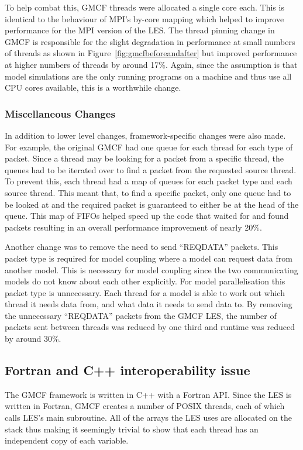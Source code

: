 To help combat this, GMCF threads were allocated a single core each. This is
identical to the behaviour of MPI's by-core mapping which helped to improve
performance for the MPI version of the LES. The thread pinning change in GMCF is
responsible for the slight degradation in performance at small numbers of
threads as shown in Figure~\ref{fig:gmcfbeforeandafter} but improved performance
at higher numbers of threads by around 17\%. Again, since the assumption is that
model simulations are the only running programs on a machine and thus use all
CPU cores available, this is a worthwhile change.

\subsubsection{Miscellaneous Changes}

In addition to lower level changes, framework-specific changes were also made.
For example, the original GMCF had one queue for each thread for each type of
packet. Since a thread may be looking for a packet from a specific thread, the
queues had to be iterated over to find a packet from the requested source
thread. To prevent this, each thread had a map of queues for each packet type
and each source thread. This meant that, to find a specific packet, only one
queue had to be looked at and the required packet is guaranteed to either be at
the head of the queue. This map of FIFOs helped speed up the code that waited
for and found packets resulting in an overall performance improvement of nearly
20\%.

Another change was to remove the need to send ``REQDATA'' packets. This packet
type is required for model coupling where a model can request data from another
model. This is necessary for model coupling since the two communicating models
do not know about each other explicitly. For model parallelisation this packet
type is unnecessary. Each thread for a model is able to work out which thread it
needs data from, and what data it needs to send data to. By removing the
unnecessary ``REQDATA'' packets from the GMCF LES, the number of packets sent
between threads was reduced by one third and runtime was reduced by around 30\%. 

\subsection{Fortran and C++ interoperability issue}
\label{sec:fortrancppinteroperability}

The GMCF framework is written in C++ with a Fortran API. Since the LES is
written in Fortran, GMCF creates a number of POSIX threads, each of which calls
LES's main subroutine. All of the arrays the LES uses are allocated on the stack
thus making it seemingly trivial to show that each thread has an independent
copy of each variable.

